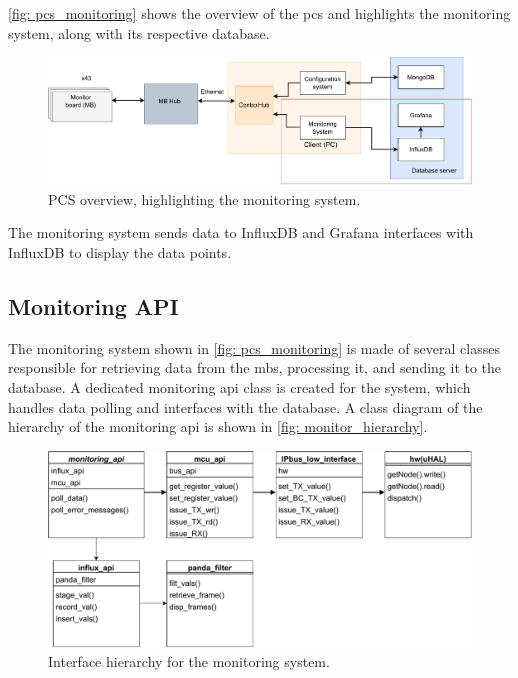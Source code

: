\documentclass[main.tex]{subfiles}
\begin{document}
 \autoref{fig: pcs_monitoring} shows the overview of the \gls{pcs} and highlights the monitoring system, along with its respective database.
 
 \begin{figure}[!htpb]
    \centering
    \includegraphics[width=17cm, scale=1.5]{images/PCS overview_monitor.pdf}
    \caption{PCS overview, highlighting the monitoring system.}
    \label{fig: pcs_monitoring}
\end{figure}
\FloatBarrier
 
 The monitoring system sends data to InfluxDB and Grafana interfaces with InfluxDB to display the data points. 



\subsection{Monitoring API}
The monitoring system shown in \autoref{fig: pcs_monitoring} is made of several classes responsible for retrieving data from the \gls{mb}s, processing it, and sending it to the database. A dedicated monitoring \gls{api} class is created for the system, which handles data polling and interfaces with the database. A class diagram of the hierarchy of the monitoring \gls{api} is shown in \autoref{fig: monitor_hierarchy}.

 \begin{figure}[!htpb]
    \centering
    \includegraphics[width=17cm, scale=1.5]{images/monitor_interface_hierarchy.pdf}
    \caption{Interface hierarchy for the monitoring system.}
    \label{fig: monitor_hierarchy}
\end{figure}
\FloatBarrier
\end{document}

